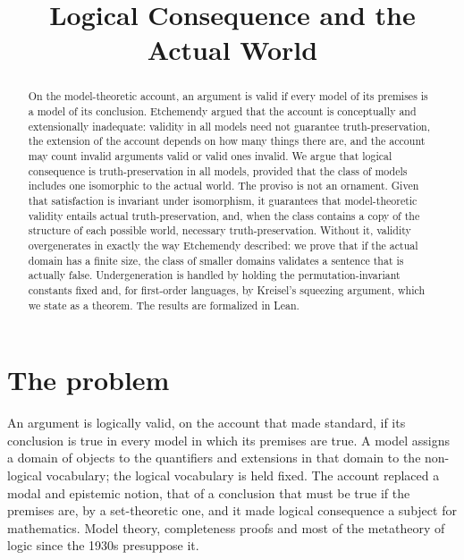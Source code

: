 \documentclass{situationist-preprint}
\title{Logical Consequence and the Actual World}
\begin{document}
\maketitle

\begin{abstract}
On the model-theoretic account, an argument is valid if every model of its premises is a model of its conclusion. Etchemendy argued that the account is conceptually and extensionally inadequate: validity in all models need not guarantee truth-preservation, the extension of the account depends on how many things there are, and the account may count invalid arguments valid or valid ones invalid. We argue that logical consequence is truth-preservation in all models, provided that the class of models includes one isomorphic to the actual world. The proviso is not an ornament. Given that satisfaction is invariant under isomorphism, it guarantees that model-theoretic validity entails actual truth-preservation, and, when the class contains a copy of the structure of each possible world, necessary truth-preservation. Without it, validity overgenerates in exactly the way Etchemendy described: we prove that if the actual domain has a finite size, the class of smaller domains validates a sentence that is actually false. Undergeneration is handled by holding the permutation-invariant constants fixed and, for first-order languages, by Kreisel's squeezing argument, which we state as a theorem. The results are formalized in Lean.
\end{abstract}

\section{The problem}

An argument is logically valid, on the account that \citet{Tarski1936} made standard, if its conclusion is true in every model in which its premises are true. A model assigns a domain of objects to the quantifiers and extensions in that domain to the non-logical vocabulary; the logical vocabulary is held fixed. The account replaced a modal and epistemic notion, that of a conclusion that must be true if the premises are, by a set-theoretic one, and it made logical consequence a subject for mathematics. Model theory, completeness proofs and most of the metatheory of logic since the 1930s presuppose it.
\end{document}
